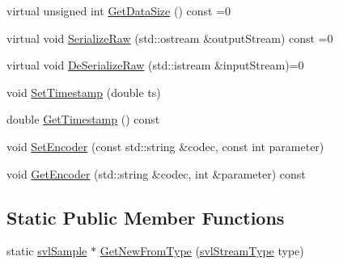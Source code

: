 \begin{DoxyCompactItemize}
\item 
virtual unsigned int \hyperlink{classsvl_sample_afe89dcbee419cb667618ec6a0c37e7f7}{Get\-Data\-Size} () const =0
\item 
virtual void \hyperlink{classsvl_sample_a3d0ae4485588110c4be9bdf25fac8f57}{Serialize\-Raw} (std\-::ostream \&output\-Stream) const =0
\item 
virtual void \hyperlink{classsvl_sample_abee71d4fe9d4caa789e785849fb87b42}{De\-Serialize\-Raw} (std\-::istream \&input\-Stream)=0
\item 
void \hyperlink{classsvl_sample_ab19048a490b5e0bf7e64a179ced734ae}{Set\-Timestamp} (double ts)
\item 
double \hyperlink{classsvl_sample_a5c4e2cdcca42525f9d53a27f07c7ce23}{Get\-Timestamp} () const 
\item 
void \hyperlink{classsvl_sample_af7fb10a50caf12a3b565eb740d17e81d}{Set\-Encoder} (const std\-::string \&codec, const int parameter)
\item 
void \hyperlink{classsvl_sample_a75d3fef76782b37c542f5a699ce814dd}{Get\-Encoder} (std\-::string \&codec, int \&parameter) const 
\end{DoxyCompactItemize}
\subsection*{Static Public Member Functions}
\begin{DoxyCompactItemize}
\item 
static \hyperlink{classsvl_sample}{svl\-Sample} $\ast$ \hyperlink{classsvl_sample_a8860c1a7379474704fadb0e704fec15b}{Get\-New\-From\-Type} (\hyperlink{svl_definitions_8h_aa00696d338a58db361335a01fd11e122}{svl\-Stream\-Type} type)
\end{DoxyCompactItemize}



